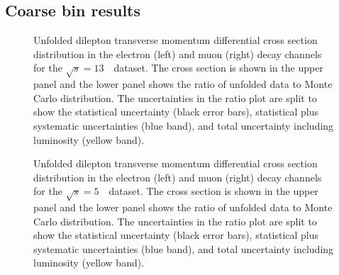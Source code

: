 \clearpage
\subsection{Coarse bin results}

\begin{figure}[h]
\centering
{}
\caption{Unfolded dilepton transverse momentum differential cross section distribution in the electron (left) and muon (right) \Zboson decay channels for the $\sqrt{s} = 13$~\TeV\ dataset. The cross section is shown in the upper panel and the lower panel shows the ratio of unfolded data to Monte Carlo distribution. The uncertainties in the ratio plot are split to show the statistical uncertainty (black error bars), statistical plus systematic uncertainties (blue band), and total uncertainty including luminosity (yellow band).}\end{figure}


\begin{figure}[h]
\centering
{}
\caption{Unfolded dilepton transverse momentum differential cross section distribution in the electron (left) and muon (right) \Zboson decay channels for the $\sqrt{s} = 5$~\TeV\ dataset. The cross section is shown in the upper panel and the lower panel shows the ratio of unfolded data to Monte Carlo distribution. The uncertainties in the ratio plot are split to show the statistical uncertainty (black error bars), statistical plus systematic uncertainties (blue band), and total uncertainty including luminosity (yellow band).}\end{figure}